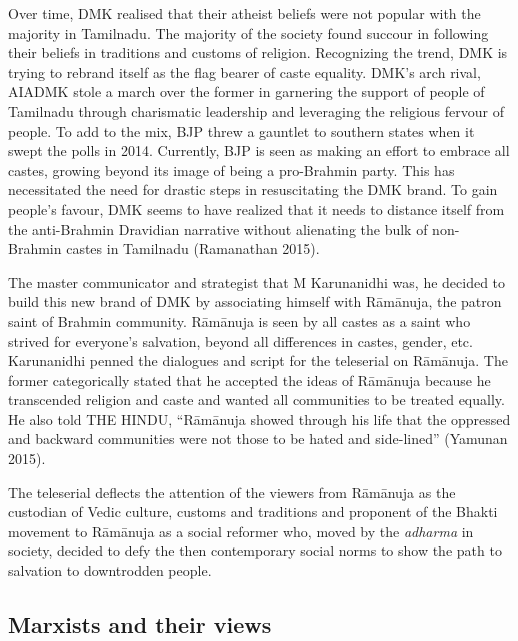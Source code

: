 Over time, DMK realised that their atheist beliefs were not popular with the majority in Tamilnadu. The majority of the society found succour in following their beliefs in traditions and customs of religion. Recognizing the trend, DMK is trying to rebrand itself as the flag bearer of caste equality. DMK’s arch rival, AIADMK stole a march over the former in garnering the support of people of Tamilnadu through charismatic leadership and leveraging the religious fervour of people. To add to the mix, BJP threw a gauntlet to southern states when it swept the polls in 2014. Currently, BJP is seen as making an effort to embrace all castes, growing beyond its image of being a pro-Brahmin party. This has necessitated the need for drastic steps in resuscitating the DMK brand. To gain people’s favour, DMK seems to have realized that it needs to distance itself from the anti-Brahmin Dravidian narrative without alienating the bulk of non-Brahmin castes in Tamilnadu (Ramanathan 2015).

The master communicator and strategist that M Karunanidhi was, he decided to build this new brand of DMK by associating himself with Rāmānuja, the patron saint of Brahmin community. Rāmānuja is seen by all castes as a saint who strived for everyone’s salvation, beyond all differences in castes, gender, etc. Karunanidhi penned the dialogues and script for the teleserial on Rāmānuja. The former categorically stated that he accepted the ideas of Rāmānuja because he transcended religion and caste and wanted all communities to be treated equally. He also told THE HINDU, “Rāmānuja showed through his life that the oppressed and backward communities were not those to be hated and side-lined” (Yamunan 2015).

The teleserial deflects the attention of the viewers from Rāmānuja as the custodian of Vedic culture, customs and traditions and proponent of the Bhakti movement to Rāmānuja as a social reformer who, moved by the \textit{adharma} in society, decided to defy the then contemporary social norms to show the path to salvation to downtrodden people.

\vskip -20pt


\subsection*{Marxists and their views}

\vskip -5pt

